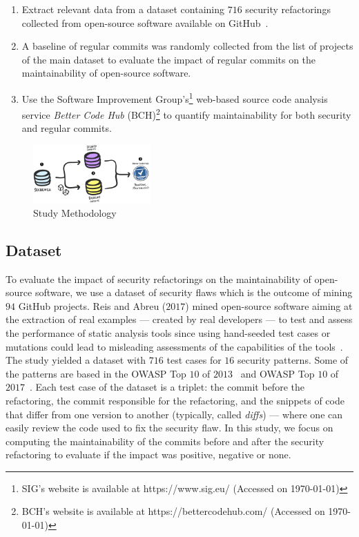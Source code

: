 \documentclass[10pt,conference]{IEEEtran}
\begin{document}
\begin{enumerate}
	\item Extract relevant data from a dataset containing $716$ security
	refactorings collected from open-source software available on
	GitHub~\cite{Reis:2017:IJSSE}.
	\item A baseline of regular commits was randomly collected from the list of
	projects of the main dataset to evaluate the impact of regular commits on the
	maintainability of open-source software.
  \item Use the Software Improvement Group's\footnote{SIG's website is available
  at https://www.sig.eu/ (Accessed on \today{})} web-based source code analysis
  service \emph{Better Code Hub} (BCH)\footnote{BCH's website is available at
  https://bettercodehub.com/ (Accessed on \today{})} to quantify maintainability
  for both security and regular commits.
\end{enumerate}

%
\begin{figure}[h]
 	\centering 	\includegraphics[width=0.4\textwidth]{figures/methodology.pdf}
 	\caption{Study Methodology}
	\label{fig:met}
\end{figure}
%
\subsection{Dataset}
%
To evaluate the impact of security refactorings on the maintainability of
open-source software, we use a dataset of security flaws which is the outcome of
mining $94$ GitHub projects. Reis and Abreu ($2017$) mined open-source
software aiming at the extraction of real examples --- created by real
developers --- to test and assess the performance of static analysis tools since
using hand-seeded test cases or mutations could lead to misleading assessments
of the capabilities of the tools~\cite{just2014mutants}. The study yielded a
dataset with $716$ test cases for $16$ security patterns. Some of the patterns
are based in the OWASP Top $10$ of $2013$~\cite{oswap:2013} and OWASP Top $10$ of
$2017$~\cite{oswap:2017}. Each test case of the
dataset is a triplet: the commit before the refactoring, the commit responsible
for the refactoring, and the snippets of code that differ from one version to
another (typically, called \textit{diffs}) --- where one can easily review the
code used to fix the security flaw. In this study, we focus on computing the
maintainability of the commits before and after the security refactoring to
evaluate if the impact was positive, negative or none.
\end{document}
